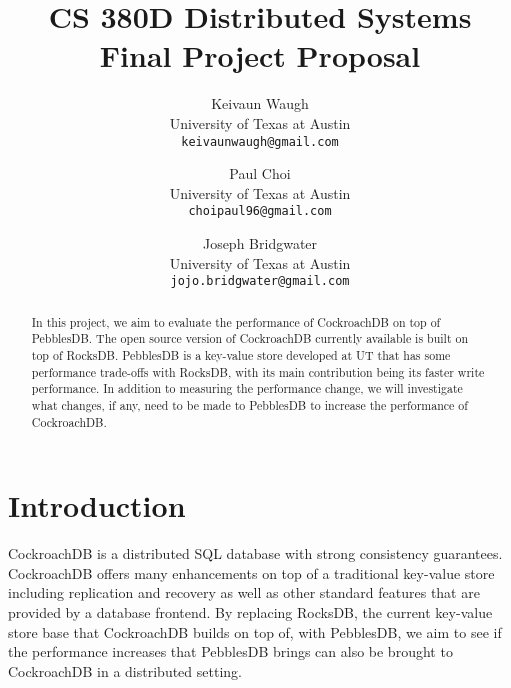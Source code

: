 \documentclass[10pt,twocolumn,letterpaper]{article}
\begin{document}
\title{CS 380D Distributed Systems Final Project Proposal}

\author{Keivaun Waugh\\
University of Texas at Austin\\
{\tt\small keivaunwaugh@gmail.com}
\and
Paul Choi\\
University of Texas at Austin\\
{\tt\small choipaul96@gmail.com}
\and
Joseph Bridgwater\\
University of Texas at Austin\\
{\tt\small jojo.bridgwater@gmail.com}
}

\maketitle

\begin{abstract}
    In this project, we aim to evaluate the performance of CockroachDB on top of
    PebblesDB. The open source version of CockroachDB currently available is
    built on top of RocksDB. PebblesDB is a key-value store developed at UT
    that has some performance trade-offs with RocksDB, with its main
    contribution being its faster write performance. In addition to measuring
    the performance change, we will investigate what changes, if any, need to
    be made to PebblesDB to increase the performance of CockroachDB.
\end{abstract}

\section{Introduction}
CockroachDB is a distributed SQL database with strong consistency guarantees. CockroachDB offers many enhancements on top of a traditional key-value store including replication and recovery as well as other standard features that are provided by a database frontend. By replacing RocksDB, the current key-value store base that CockroachDB builds on top of, with PebblesDB, we aim to see if the performance increases that PebblesDB brings can also be brought to CockroachDB in a distributed setting.

\end{document}
